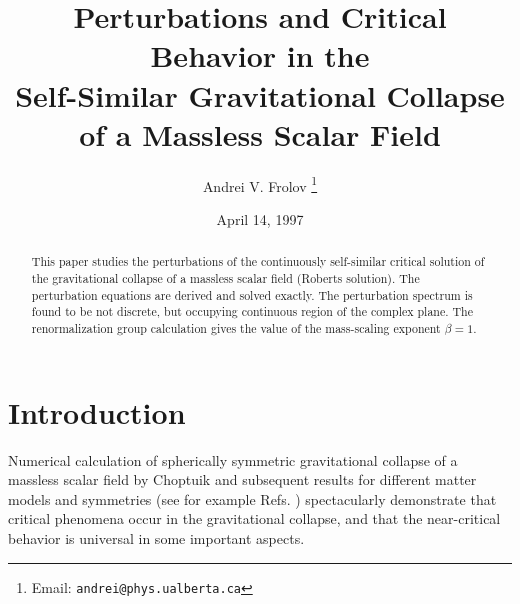%
%


\newcommand{\Lie}{{\pounds}}
\renewcommand{\Re}{\text{Re}\,}
\renewcommand{\Im}{\text{Im}\,}


\epsfverbosetrue
\draft



\title{
  Perturbations and Critical Behavior in the\\
  Self-Similar Gravitational Collapse of a Massless Scalar Field
}
\author{Andrei V. Frolov%
  \thanks{Email: \texttt{andrei@phys.ualberta.ca}}}
\address{
  Physics Department, University of Alberta\\
  Edmonton, Alberta, Canada, T6G 2J1}
\date{April 14, 1997}
\maketitle

\begin{abstract}
  This paper studies the perturbations of the continuously self-similar
  critical solution of the gravitational collapse of a massless scalar
  field (Roberts solution). The perturbation equations are derived and
  solved exactly. The perturbation spectrum is found to be not
  discrete, but occupying continuous region of the complex plane. The
  renormalization group calculation gives the value of the mass-scaling
  exponent $\beta=1$.
\end{abstract}

\narrowtext



\section{Introduction} \label{sec:intro}

Numerical calculation of spherically symmetric gravitational collapse
of a massless scalar field by Choptuik \cite{Choptuik:93} and
subsequent results for different matter models and symmetries (see for
example Refs. \cite{Abrahams&Evans:93,Evans&Coleman:94,%
Hirschmann&Eardley:95a,Hirschmann&Eardley:95b}) spectacularly
demonstrate that critical phenomena occur in the gravitational
collapse, and that the near-critical behavior is universal in some
important aspects.


